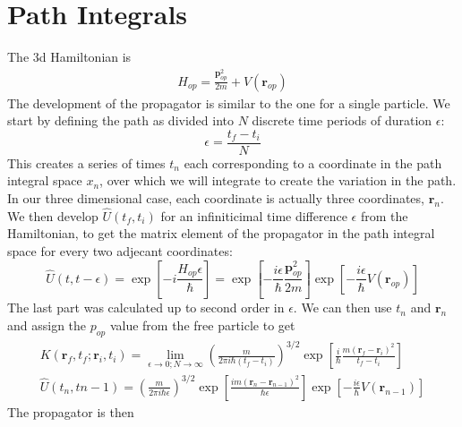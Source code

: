 \documentclass{article}
\begin{document}
\section{Path Integrals}
The 3d Hamiltonian is
\begin{eqnarray}
    H_{op} = \frac{\boldsymbol{p}_{op}^2}{2m} + V(\boldsymbol{r}_{op})
\end{eqnarray}
The development of the propagator is similar to the one for a single particle. We start by defining the path as divided into $N$ discrete time periods of duration $\epsilon$:
\begin{equation}
    \epsilon = \frac{t_f - t_i}{N}
\end{equation}
This creates a series of times $t_n$ each corresponding to a coordinate in the path integral space $x_n$, over which we will integrate to create the variation in the path. In our three dimensional case, each coordinate is actually three coordinates, $\boldsymbol{r}_n$. We then develop $\hat{U}(t_f, t_i)$ for an infiniticimal time difference $\epsilon$ from the Hamiltonian, to get the matrix element of the propagator in the path integral space for every two adjecant coordinates:
\begin{equation}
    \hat{U}(t, t - \epsilon) = \exp[-i\frac{H_{op}\epsilon}{\hbar}] = \exp[-\frac{i\epsilon}{\hbar}\frac{ \boldsymbol{p}_{op}^2}{2m}]\exp[-\frac{i\epsilon}{\hbar}V(\boldsymbol{r}_{op})]
\end{equation}
The last part was calculated up to second order in $\epsilon$. We can then use $t_n$ and $\boldsymbol{r}_n$ and assign the $p_{op}$ value from the free particle to get
\begin{equation}
\begin{gathered}
    K(\boldsymbol{r}_f, t_f; \boldsymbol{r}_i, t_i) = \lim_{\epsilon\rightarrow0;N\rightarrow\infty}\left(\frac{m}{2\pi i\hbar(t_f-t_i)}\right)^{3/2} \exp[\frac{i}{\hbar}\frac{m(\boldsymbol{r}_f - \boldsymbol{r}_i)^2}{t_f-t_i}] \\
    \hat{U}(t_n, t{n-1}) = \left(\frac{m}{2\pi i\hbar\epsilon}\right)^{3/2} \exp[\frac{im(\boldsymbol{r}_n - \boldsymbol{r}_{n-1})^2}{\hbar\epsilon}]\exp[-\frac{i\epsilon}{\hbar}V(\boldsymbol{r}_{n-1})]
\end{gathered}
\end{equation}
The propagator is then
\end{document}
